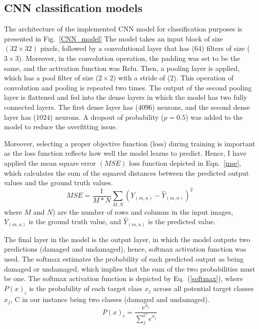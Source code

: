 \subsection{CNN classification models}
\label{sec422}
The architecture of the implemented CNN model for classification purposes is presented in Fig.~\ref{CNN_model}
The model takes an input block of size \((32\times 32)\) pixels, followed by a convolutional layer that has (\(64\)) filters of size (\(3\times 3\)).
Moreover, in the convolution operation, the padding was set to be the same,  and the activation function was Relu.
Then, a pooling layer is applied, which has a pool filter of size (\(2\times 2\)) with a stride of (\(2\)).
This operation of convolution and pooling is repeated two times.
The output of the second pooling layer is flattened and fed into the dense layers in which the model has two fully connected layers.
The first dense layer has (\(4096\)) neurons, and the second dense layer has (\(1024\)) neurons.
A dropout of probability (\(p = 0.5\)) was added to the model to reduce the overfitting issue.

Moreover, selecting a proper objective function (loss) during training is important as the loss function reflects how well the model learns to predict.
Hence, I have applied the mean square error \((MSE)\) loss function depicted in Eqn.~\ref{mse}, which calculates the sum of the squared distances between the predicted output values and the ground truth values.
\begin{equation}
	MSE=\frac{1}{M*N}\sum_{M,N}^{}(Y_{(m,n)}-\hat{Y}_{(m,n)})^2
	\label{mse}
\end{equation}
where \(M\) and \(N\)) are the number of rows and columns in the input images, \(Y_{(m,n)}\) is the ground truth value, and \(\hat{Y}_{(m,n)}\) is the predicted value.

The final layer in the model is the output layer, in which the model outputs two predictions (damaged and undamaged), hence, softmax activation function was used.
The softmax estimates the probability of each predicted output as being damaged or undamaged, which implies that the sum of the two probabilities must be one.
The softmax activation function is depicted by Eq.~(\ref{softmax}), where \(P(x)_{i}\) is the probability of each target class \(x_{j}\) across all potential target classes \(x_{j}\), C in our instance being two classes (damaged and undamaged).
\begin{equation}
	P(x)_{i} = \frac{e^{x_{i}}}{\sum_{j}^{C} e^{x_{j}}}
	\label{softmax}
\end{equation} 

